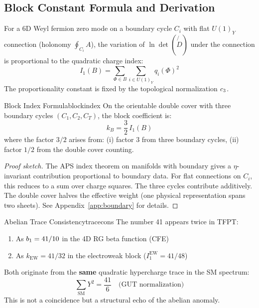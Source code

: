 \subsection{Block Constant Formula and Derivation}

\begin{tcolorbox}[colback=green!3, colframe=green!50!black, 
    title={\textbf{Lemma (Boundary Trace Index)}}, fonttitle=\bfseries]
For a 6D Weyl fermion zero mode on a boundary cycle $C_i$ with flat $U(1)_Y$ 
connection (holonomy $\oint_{C_i} A$), the variation of $\ln\det(\not{\!D})$ 
under the connection is proportional to the quadratic charge index:
\begin{equation}
    I_1(B) = \sum_{\Phi \in B} \sum_{i \in U(1)_Y} q_i(\Phi)^2
\end{equation}
The proportionality constant is fixed by the topological normalization $c_3$.
\end{tcolorbox}

\begin{theorem}{Block Index Formula}{blockindex}
On the orientable double cover with three boundary cycles $(C_1, C_2, C_T)$, 
the block coefficient is:
\begin{equation}
    k_B = \frac{3}{2}\, I_1(B)
\end{equation}
where the factor $3/2$ arises from: (i) factor 3 from three boundary cycles, 
(ii) factor $1/2$ from the double cover counting.
\end{theorem}

\begin{proof}[Proof sketch]
The APS index theorem on manifolds with boundary gives a $\eta$-invariant 
contribution proportional to boundary data. For flat connections on $C_i$, 
this reduces to a sum over charge squares. The three cycles contribute 
additively. The double cover halves the effective weight (one physical 
representation spans two sheets). See Appendix~\ref{app:boundary} for details.
\end{proof}

\begin{corollary}{Abelian Trace Consistency}{tracecons}
The number 41 appears twice in TFPT:
\begin{enumerate}[leftmargin=1.5em, topsep=2pt, itemsep=1pt]
    \item As $b_1 = 41/10$ in the 4D RG beta function (CFE)
    \item As $k_{\text{EW}} = 41/32$ in the electroweak block ($I_1^{\text{EW}} = 41/48$)
\end{enumerate}
Both originate from the \textbf{same} quadratic hypercharge trace in the SM spectrum:
\begin{equation}
    \sum_{\text{SM}} Y^2 = \frac{41}{6} \quad \text{(GUT normalization)}
\end{equation}
This is not a coincidence but a structural echo of the abelian anomaly.
\end{corollary}

